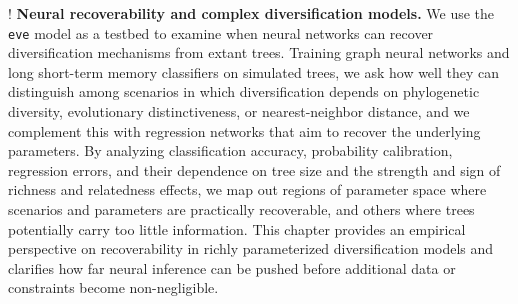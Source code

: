 \begin{fancyenumerate}
    \item! \textbf{Neural recoverability and complex diversification models.} We use the \texttt{eve} model as a testbed to examine when neural networks can recover diversification mechanisms from extant trees. Training graph neural networks and long short-term memory classifiers on simulated trees, we ask how well they can distinguish among scenarios in which diversification depends on phylogenetic diversity, evolutionary distinctiveness, or nearest-neighbor distance, and we complement this with regression networks that aim to recover the underlying parameters. By analyzing classification accuracy, probability calibration, regression errors, and their dependence on tree size and the strength and sign of richness and relatedness effects, we map out regions of parameter space where scenarios and parameters are practically recoverable, and others where trees potentially carry too little information. This chapter provides an empirical perspective on recoverability in richly parameterized diversification models and clarifies how far neural inference can be pushed before additional data or constraints become non-negligible.
\end{fancyenumerate}
